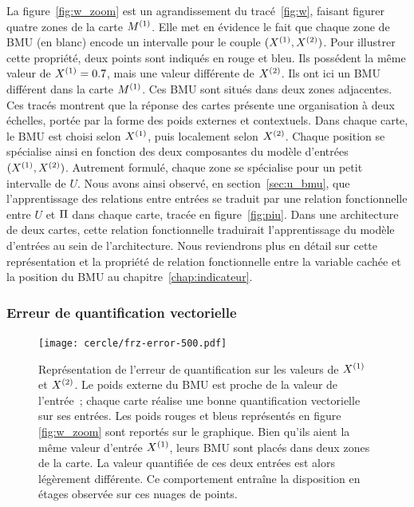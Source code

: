 \documentclass[../main]{subfiles}
\begin{document}
La figure~\ref{fig:w_zoom} est un agrandissement du tracé~\ref{fig:w}, faisant figurer quatre zones de la carte $M^{({1})}$. Elle met en évidence le fait que chaque zone de BMU (en blanc) encode un intervalle pour le couple $(X^{({1})}, X^{({2})})$.
Pour illustrer cette propriété, deux points sont indiqués en rouge et bleu. Ils possédent la même valeur de $X^{({1})} = 0.7$, mais une valeur différente de $X^{({2})}$. 
Ils ont ici un BMU différent dans la carte $M^{({1})}$. Ces BMU sont situés dans deux zones adjacentes.
Ces tracés montrent que la réponse des cartes présente une organisation à deux échelles, portée par la forme des poids externes et contextuels. 
Dans chaque carte, le BMU est choisi selon $X^{({1})}$, puis localement selon $X^{({2})}$.
Chaque position se spécialise ainsi en fonction des deux composantes du modèle d'entrées $(X^{({1})}, X^{({2})})$. 
Autrement formulé, chaque zone se spécialise pour un petit intervalle de $U$.
Nous avons ainsi observé, en section~\ref{sec:u_bmu}, que l'apprentissage des relations entre entrées se traduit par une relation fonctionnelle entre $U$ et $\Pi$ dans chaque carte, tracée en figure~\ref{fig:piu}. Dans une architecture de deux cartes, cette relation fonctionnelle traduirait l'apprentissage du modèle d'entrées au sein de l'architecture.
Nous reviendrons plus en détail sur cette représentation et la propriété de relation fonctionnelle entre la variable cachée et la position du BMU au chapitre~\ref{chap:indicateur}. 

\subsubsection{Erreur de quantification vectorielle}

\begin{figure}
	\centering\texttt{[image: cercle/frz-error-500.pdf]}
	\caption{Représentation de l'erreur de quantification sur les valeurs de $X^{({1})}$ et $X^{({2})}$. Le poids externe du BMU est proche de la valeur de l'entrée~; chaque carte réalise une bonne quantification vectorielle sur ses entrées. 
	Les poids rouges et bleus représentés en figure \ref{fig:w_zoom} sont reportés sur le graphique. Bien qu'ils aient la même valeur d'entrée $X^{({1})}$, leurs BMU sont placés dans deux zones de la carte. La valeur quantifiée de ces deux entrées est alors légèrement différente. Ce comportement entraîne la disposition en étages observée sur ces nuages de points. \label{fig:qv}}
\end{figure}
\end{document}
